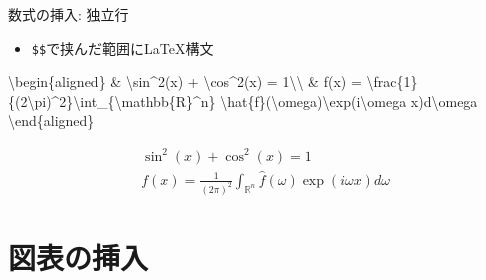 \documentclass[14pt,ignorenonframetext,]{beamer}
\newenvironment{Shaded}{\begin{snugshade}}{\end{snugshade}}
\newcommand{\SpecialCharTok}[1]{\textcolor[rgb]{0.00,0.00,0.00}{#1}}
\newcommand{\SpecialStringTok}[1]{\textcolor[rgb]{0.31,0.60,0.02}{#1}}
\providecommand{\tightlist}{%
  \setlength{\itemsep}{0pt}\setlength{\parskip}{0pt}}
\begin{document}
\begin{frame}[fragile]{数式の挿入: 独立行}
\protect\hypertarget{ux6570ux5f0fux306eux633fux5165-ux72ecux7acbux884c}{}

\begin{itemize}
\tightlist
\item
  \texttt{\$\$}で挟んだ範囲に\LaTeX 構文
\end{itemize}

\begin{Shaded}
\begin{Highlighting}[]
\SpecialStringTok{$$}\SpecialCharTok{\textbackslash{}begin}\SpecialStringTok{\{aligned\}}
\SpecialStringTok{& }\SpecialCharTok{\textbackslash{}sin}\SpecialStringTok{^2(x) + }\SpecialCharTok{\textbackslash{}cos}\SpecialStringTok{^2(x) = 1}\SpecialCharTok{\textbackslash{}\textbackslash{}}
\SpecialStringTok{& f(x) = }\SpecialCharTok{\textbackslash{}frac}\SpecialStringTok{\{1\}\{(2}\SpecialCharTok{\textbackslash{}pi}\SpecialStringTok{)^2\}}\SpecialCharTok{\textbackslash{}int}\SpecialStringTok{_\{}\SpecialCharTok{\textbackslash{}mathbb}\SpecialStringTok{\{R\}^n\}}
\SpecialCharTok{\textbackslash{}hat}\SpecialStringTok{\{f\}(}\SpecialCharTok{\textbackslash{}omega}\SpecialStringTok{)}\SpecialCharTok{\textbackslash{}exp}\SpecialStringTok{(i}\SpecialCharTok{\textbackslash{}omega}\SpecialStringTok{ x)d}\SpecialCharTok{\textbackslash{}omega}
\SpecialCharTok{\textbackslash{}end}\SpecialStringTok{\{aligned\}$$}
\end{Highlighting}
\end{Shaded}

\[\begin{aligned}
& \sin^2(x) + \cos^2(x) = 1\\
& f(x) = \frac{1}{(2\pi)^2}\int_{\mathbb{R}^n}\hat{f}(\omega)\exp(i\omega x)d\omega
\end{aligned}\]

\end{frame}

\hypertarget{ux56f3ux8868ux306eux633fux5165}{%
\section{図表の挿入}\label{ux56f3ux8868ux306eux633fux5165}}
\end{document}

